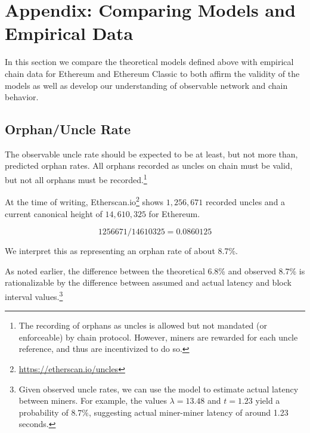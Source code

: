 \documentclass[11pt]{article}
\begin{document}

	\section{\normalsize{Appendix: Comparing Models and Empirical Data}}

	In this section we compare the theoretical models defined above with empirical chain data
	for Ethereum and Ethereum Classic to both affirm the validity of the models as well
	as develop our understanding of observable network and chain behavior.

	\subsection{\normalsize{Orphan/Uncle Rate}}


	The observable uncle rate should be expected to be at least, but not more than, predicted orphan rates.
	All orphans recorded as uncles on chain must be valid, but not all orphans must be recorded.\footnote{
		The recording of orphans as uncles is allowed but not mandated (or enforceable) by chain protocol.
		However, miners are rewarded for each uncle reference, and thus are incentivized to do so.
	}

	At the time of writing, Etherscan.io\footnote{\url{https://etherscan.io/uncles}}
	shows $1,256,671$ recorded uncles and a current canonical height of $14,610,325$ for Ethereum.

	\begin{equation}
		1256671 / 14610325 =  0.0860125
	\end{equation}

	We interpret this as representing an orphan rate of about 8.7\%.

	As noted earlier, the difference between the theoretical 6.8\% and observed 8.7\% is rationalizable by
	the difference between assumed and actual latency and block interval values.\footnote{
		Given observed uncle rates, we can use the model to estimate actual latency between miners.
		For example, the values $\lambda = 13.48$ and $t = 1.23$ yield a probability of $8.7\%$,
		suggesting actual miner-miner latency of around 1.23 seconds.
	}
\end{document}
